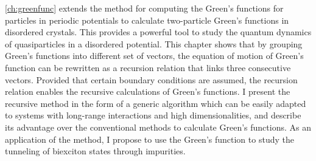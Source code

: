 \autoref{ch:greenfunc} extends the method\cite{Berciu2010, Berciu2011, Berciu2012} for computing the Green's 
functions for particles in periodic potentials to calculate 
two-particle 
Green's functions in disordered crystals. This provides a powerful tool to study the quantum dynamics of quasiparticles in a disordered potential. 
This chapter shows that by grouping Green's functions into different set of vectors, the 
equation of motion of Green's function can be rewritten as a recursion relation that links three consecutive vectors. 
Provided that certain boundary conditions are assumed, the recursion relation enables the recursive calculations of Green's 
functions. I present the recursive method in the form of a generic algorithm which can be easily 
adapted to systems with long-range interactions and high dimensionalities, and describe its advantage over the conventional methods to calculate Green's functions. As an application of the method, I propose
to use the Green's function to study the tunneling of biexciton states through
 impurities.


